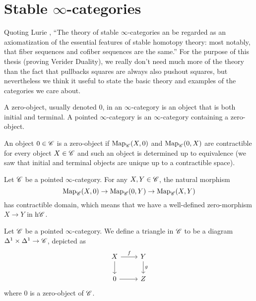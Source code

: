 \documentclass[../../thesis.tex]{subfiles}
\begin{document}
\section{Stable $\infty$-categories}
Quoting Lurie \cite{HA}, ``The theory of stable $\infty$-categories an be regarded as an axiomatization of the essential features of stable homotopy theory: most notably, that fiber sequences and cofiber sequences are the same.''
For the purpose of this thesis (proving Verider Duality), we really don't need much more of the theory than the fact that pullbacks squares are always also pushout squares, but nevertheless we think it useful to state the basic theory and examples of the categories we care about.
\begin{definition}[{\cite[Definition 1.1.1.1.]{HA}}]
    A zero-object, usually denoted $0$, in an $\infty$-category is an object that is both initial and terminal.
    A pointed $\infty$-category is an $\infty$-category containing a zero-object.
\end{definition}
\begin{remark}
    An object $0\in \mathscr{C}$ is a zero-object if $\mathrm{Map}_{\mathscr{C}}(X,0)$ and $\mathrm{Map}_{\mathscr{C}}(0,X)$ are contractible for every object $X\in \mathscr{C}$ and such an object is determined up to equivalence (we saw that initial and terminal objects are unique up to a contractible space).
\end{remark}
\begin{remark}[{\cite{HA}[Remark 1.1.1.3.]}]
    Let $\mathscr{C}$ be a pointed $\infty$-category.
    For any $X,Y \in \mathscr{C}$, the natural morphism
    \[
        \mathrm{Map}_{\mathscr{C}}(X, 0) \to \mathrm{Map}_{\mathscr{C}}(0, Y) \to \mathrm{Map}_{\mathscr{C}}(X,Y)
    \]
    has contractible domain, which means that we have a well-defined zero-morphism $X\to Y$ in $\mathrm{h}\mathscr{C}$.
\end{remark}
\begin{definition}[{\cite{HA}[Definition 1.1.1.4.]}]
    Let $\mathscr{C}$ be a pointed $\infty$-category.
    We define a triangle in $\mathscr{C}$ to be a diagram $\Delta^1 \times \Delta^1 \to \mathscr{C}$, depicted as
    \begin{equation}\label{triangle}\begin{tikzcd}
            X & Y \\
            0 & Z
            \arrow["f", from=1-1, to=1-2]
            \arrow[from=2-1, to=2-2]
            \arrow["g", from=1-2, to=2-2]
            \arrow[from=1-1, to=2-1]
        \end{tikzcd}\end{equation}
    where $0$ is a zero-object of $\mathscr{C}$.
\end{definition}
\end{document}
